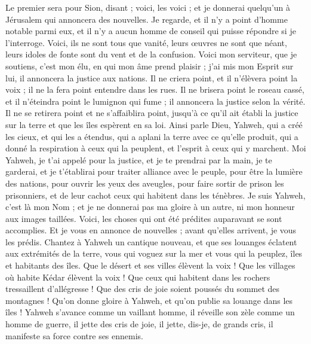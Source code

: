 \begin{multicols}{2}
Le premier sera pour Sion, disant ; voici, les voici ; et je donnerai quelqu'un à Jérusalem qui annoncera des nouvelles.
Je regarde, et il n'y a point d'homme notable parmi eux, et il n'y a aucun homme de conseil qui puisse répondre si je l'interroge.
Voici, ils ne sont tous que vanité, leurs œuvres ne sont que néant, leurs idoles de fonte sont du vent et de la confusion.
\VerseOne{}Voici mon serviteur, que je soutiens, c'est mon élu, en qui mon âme prend plaisir ; j'ai mis mon Esprit sur lui, il annoncera la justice aux nations.
Il ne criera point, et il n'élèvera point la voix ; il ne la fera point entendre dans les rues.
Il ne brisera point le roseau cassé, et il n'éteindra point le lumignon qui fume ; il annoncera la justice selon la vérité.
Il ne se retirera point et ne s'affaiblira point, jusqu'à ce qu'il ait établi la justice sur la terre et que les îles espèrent en sa loi.
Ainsi parle Dieu, Yahweh, qui a créé les cieux, et qui les a étendus, qui a aplani la terre avec ce qu'elle produit, qui a donné la respiration à ceux qui la peuplent, et l'esprit à ceux qui y marchent.
Moi Yahweh, je t'ai appelé pour la justice, et je te prendrai par la main, je te garderai, et je t'établirai pour traiter alliance avec le peuple, pour être la lumière des nations,
pour ouvrir les yeux des aveugles, pour faire sortir de prison les prisonniers, et de leur cachot ceux qui habitent dans les ténèbres.
Je suis Yahweh, c'est là mon Nom ; et je ne donnerai pas ma gloire à un autre, ni mon honneur aux images taillées.
Voici, les choses qui ont été prédites auparavant se sont accomplies. Et je vous en annonce de nouvelles ; avant qu'elles arrivent, je vous les prédis.
Chantez à Yahweh un cantique nouveau, et que ses louanges éclatent aux extrémités de la terre, vous qui voguez sur la mer et vous qui la peuplez, îles et habitants des îles.
Que le désert et ses villes élèvent la voix ! Que les villages où habite Kédar élèvent la voix ! Que ceux qui habitent dans les rochers tressaillent d'allégresse ! Que des cris de joie soient poussés du sommet des montagnes !
Qu'on donne gloire à Yahweh, et qu'on publie sa louange dans les îles !
Yahweh s'avance comme un vaillant homme, il réveille son zèle comme un homme de guerre, il jette des cris de joie, il jette, dis-je, de grands cris, il manifeste sa force contre ses ennemis.

\end{multicols}
